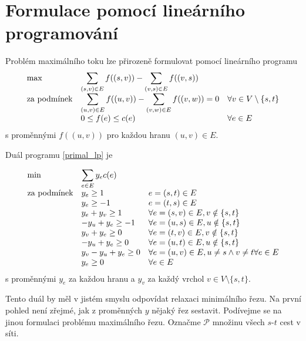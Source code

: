 \documentclass{article}
\theoremstyle{plain}
\theoremstyle{definition}
\begin{document}
\section{Formulace pomocí lineárního programování}
Problém maximálního toku lze přirozeně formulovat pomocí lineárního programu
\begin{equation}\label{primal_lp}
\begin{array}{ll@{}ll}
\text{max} & \displaystyle\sum_{(s,v)\in E}f((s,v)) - \displaystyle \sum_{(v,s)\in E}f((v,s)) &\\
\text{za podmínek}& \displaystyle\sum_{(u,v)\in E} f((u,v)) - \sum_{(v,w)\in E} f((v,w)) = 0   & & \forall v \in V\setminus \{s,t\}\\
& 0\leq f(e)\leq c(e) & & \forall e\in E
\end{array}
\end{equation}
s proměnnými $f((u,v))$ pro každou hranu $(u,v)\in E$.

Duál programu \ref{primal_lp} je

\begin{equation}\label{dual_lp}
\begin{array}{ll@{}ll}
\text{min} & \displaystyle\sum_{e\in E}y_ec(e)  &\\
\text{za podmínek}& y_e\geq 1   & & e=(s,t)\in E\\
& y_e \geq -1& & e=(t,s)\in E \\
&y_e+y_v\geq 1 & &\forall e=(s,v)\in E,v\notin\{s,t\} \\
&-y_u+y_e \geq -1 & & \forall e=(u,s)\in E,u\notin\{s,t\}\\

&y_v+y_e\geq 0 & & \forall e=(t,v)\in E,v\notin\{s,t\}\\

&-y_u+y_e\geq 0 & & \forall e=(u,t)\in E,u\notin\{s,t\}\\

& y_v-y_u+y_{e} \geq 0 & & \forall e=(u,v)\in E,u\neq s \wedge v \neq t \forall e\in E\\

&y_e\geq 0 & & \forall e\in E
\end{array}
\end{equation}
s proměnnými $y_e$ za každou hranu a $y_v$ za každý vrchol $v\in V\setminus \{s,t\}$.

Tento duál by měl v jistém smyslu odpovídat relaxaci minimálního řezu.  Na první pohled není zřejmé, jak z proměnných $y$ nějaký řez sestavit. Podívejme se na jinou formulaci problému maximálního řezu. Označme $\mathcal{P}$ množinu všech $s$-$t$ cest v síti. 
\end{document}
